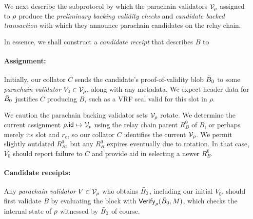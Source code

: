 We next describe the subprotocol by which the parachain validators $\mathcal{V}_{\rho}$ assigned to $\rho$ produce the {\em preliminary backing validity checks} and {\em candidate backed transaction} with which they announce parachain candidates on the relay chain.

In essence, we shall construct a {\em candidate receipt} that describes $B$ to 

\smallskip\paragraph{Assignment:}

Initially, our collator $C$ sends the candidate's proof-of-validity blob $\bar{B}_0$ to some {\em parachain validator} $V_0 \in \mathcal{V}_{\rho}$, along with any metadata.  We expect header data for $\bar{B}_0$ justifies $C$ producing $B$, such as a VRF seal valid for this slot in $\rho$.

We caution the parachain backing validator sets $\mathcal{V}_{\rho}$ rotate.  We determine the current assignment $\rho.\mathsf{id} \mapsto \mathcal{V}_{\rho}$ using the relay chain parent $R^0_B$ of $B$, or perhaps merely its slot and $r_e$, so our collator $C$ identifies the current $\mathcal{V}_{\rho}$.  We permit slightly outdated $R^0_B$, but any $R^0_B$ expires eventually due to rotation.  In that case, $V_0$ should report failure to $C$ and provide aid in selecting a newer $R^0_B$. 

\smallskip\paragraph{Candidate receipts:}

Any {\em parachain validator} $V \in \mathcal{V}_{\rho}$ who obtains $\bar{B}_0$, including our initial $V_0$, should first validate $B$ by evaluating the block with $\mathsf{Verify}_{\rho}(\bar{B}_0,M)$, which checks the internal state of $\rho$ witnessed by $\bar{B}_0$ of course.  

